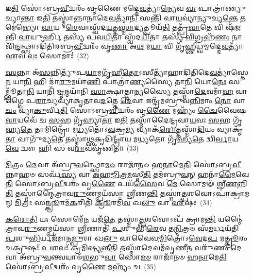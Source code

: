 𑌇\-\ul{𑌤𑌿} 𑌸𑍋॑\-𑌽𑌬𑍍𑌰\-\ul{𑌵𑍀}\-𑌦𑍍𑌵𑌰𑌂᳴ 𑌵𑍃𑌣𑍈 𑌮𑌦𑍍𑌦𑍇\-\ul{𑌵}\-𑌤𑍍𑌯𑌾॑\-\ul{𑌨𑍍𑌯𑍇}\-𑌵 \ul{𑌵𑌃} 𑌪𑌾𑌤𑍍𑌰𑌾॑𑌣𑍍𑌯𑍁𑌚𑍍𑌯𑌾\-\ul{𑌨𑍍𑌤𑌾} 𑌇\-\ul{𑌤𑌿} 𑌤𑌸𑍍𑌮𑌾॑𑌨𑍍𑌨𑌾𑌨𑌾𑌦𑍇\-\ul{𑌵}\-𑌤𑍍𑌯𑌾᳴\-\ul{𑌨𑌿} 𑌸𑌨𑍍𑌤𑌿᳴ 𑌵𑌾\-\ul{𑌯}\-𑌵𑍍𑌯𑌾॑𑌨𑍍𑌯𑍁𑌚𑍍𑌯\-\ul{𑌨𑍍𑌤𑍇} 𑌤𑌮𑍇॑𑌭𑍍𑌯𑍋 \ul{𑌵𑌾}\-𑌯𑍁\-\ul{𑌰𑍇}\-𑌵𑌾𑌸𑍍𑌵᳴𑌦\-\ul{𑌯}\-𑌤𑍍𑌤\-\ul{𑌸𑍍𑌮𑌾}\-𑌦𑍍𑌯𑌤𑍍𑌪𑍂𑌯᳴\-\ul{𑌤𑌿} 𑌤𑌤𑍍𑌪𑍍𑌰᳴\-\ul{𑌵𑌾}\-𑌤𑍇 𑌵𑌿 𑌷᳴𑌜𑌨𑍍𑌤𑌿 \ul{𑌵𑌾}\-𑌯𑍁𑌰𑍍\mbox{}𑌹𑌿 𑌤𑌸𑍍𑌯᳴ 𑌪𑌵\-\ul{𑌯𑌿}\-𑌤𑌾 𑌸𑍍𑌵᳴𑌦\-\ul{𑌯𑌿}\-𑌤𑌾 𑌤𑌸𑍍𑌯᳴ \ul{𑌵𑌿}\-𑌗𑍍𑌰𑌹᳴\-\ul{𑌣𑌂} 𑌨𑌾𑌵𑌿᳴\-\ul{𑌨𑍍𑌦}\-𑌨𑍍𑌥𑍍𑌸𑌾\-𑌽𑌦𑌿᳴𑌤𑌿𑌰𑌬𑍍𑌰\-\ul{𑌵𑍀}\-𑌦𑍍𑌵𑌰𑌂᳴ 𑌵𑍃\-\ul{𑌣𑌾} 𑌅\-\ul{𑌥} 𑌮\-\ul{𑌯𑌾} 𑌵𑌿 𑌗𑍃᳴𑌹𑍍𑌣𑍀𑌧𑍍𑌵𑌮𑍍𑌮𑌦𑍍𑌦𑍇\-\ul{𑌵}\-𑌤𑍍𑌯𑌾᳴ \ul{𑌏}\-𑌵 \ul{𑌵𑌃} 𑌸𑍋𑌮𑌾𑌃॑~(32)

\-\ul{𑌸}\-𑌨𑍍𑌨𑌾 𑌅᳴\-\ul{𑌸}\-𑌨𑍍𑌨𑌿𑌤𑍍𑌯𑍁᳴𑌪\-\ul{𑌯𑌾}\-𑌮𑌗𑍃᳴𑌹𑍀\-\ul{𑌤𑍋}\-\-𑌽𑌸𑍀𑌤𑍍𑌯𑌾᳴𑌹𑌾𑌦𑌿𑌤𑌿𑌦𑍇\-\ul{𑌵}\-𑌤𑍍𑌯𑌾॑𑌸𑍍𑌤𑍇\-\ul{𑌨} 𑌯𑌾\-\ul{𑌨𑌿} 𑌹𑌿 𑌦𑌾᳴\-\ul{𑌰𑍁}\-𑌮𑌯𑌾᳴\-\ul{𑌣𑌿} 𑌪𑌾𑌤𑍍𑌰𑌾॑\-\ul{𑌣𑍍𑌯}\-𑌸𑍍𑌯𑍈 𑌤𑌾\-\ul{𑌨𑌿} 𑌯𑍋\-\ul{𑌨𑍇𑌃} 𑌸𑌮𑍍𑌭𑍂᳴𑌤𑌾\-\ul{𑌨𑌿} 𑌯𑌾𑌨𑌿᳴ \ul{𑌮𑍃}\-𑌨𑍍𑌮𑌯𑌾᳴𑌨𑌿 \ul{𑌸𑌾}\-𑌕𑍍𑌷𑌾𑌤𑍍𑌤𑌾\-\ul{𑌨𑍍𑌯}\-𑌸𑍍𑌯𑍈 𑌤𑌸𑍍𑌮𑌾᳴\-\ul{𑌦𑍇}\-𑌵𑌮𑌾᳴\-\ul{𑌹} 𑌵𑌾𑌗𑍍𑌵𑍈 𑌪\-\ul{𑌰𑌾}\-𑌚𑍍𑌯𑌵𑍍𑌯𑌾᳴𑌕𑍃𑌤𑌾𑌵\-\ul{𑌦}\-𑌤𑍍𑌤𑍇 \ul{𑌦𑍇}\-𑌵𑌾 𑌇𑌨𑍍𑌦𑍍𑌰᳴𑌮𑌬𑍍𑌰𑍁𑌵\-\ul{𑌨𑍍𑌨𑌿}\-𑌮𑌾𑌂 \ul{𑌨𑍋} 𑌵𑌾\-\ul{𑌚𑌂} 𑌵𑍍𑌯𑌾\-\ul{𑌕𑍁}\-𑌰𑍍𑌵𑌿\-\ul{𑌤𑌿} 𑌸𑍋॑\-𑌽𑌬𑍍𑌰\-\ul{𑌵𑍀}\-𑌦𑍍𑌵𑌰𑌂᳴ 𑌵𑍃\-\ul{𑌣𑍈} 𑌮𑌹𑍍𑌯𑌂᳴ \ul{𑌚𑍈}\-𑌵𑍈𑌷 \ul{𑌵𑌾}\-𑌯𑌵𑍇᳴ 𑌚 \ul{𑌸}\-𑌹 𑌗𑍃᳴𑌹𑍍𑌯𑌾\-\ul{𑌤𑌾} 𑌇\-\ul{𑌤𑌿} 𑌤𑌸𑍍𑌮𑌾᳴𑌦𑍈𑌨𑍍𑌦𑍍𑌰𑌵𑌾\-\ul{𑌯}\-𑌵𑌃 \ul{𑌸}\-𑌹 𑌗𑍃᳴𑌹𑍍𑌯\-\ul{𑌤𑍇} 𑌤𑌾𑌮𑌿𑌨𑍍𑌦𑍍𑌰𑍋᳴ 𑌮\-\ul{𑌧𑍍𑌯}\-𑌤𑍋᳴\-𑌽\-\ul{𑌵}\-𑌕𑍍𑌰\-\ul{𑌮𑍍𑌯} 𑌵𑍍𑌯𑌾𑌕᳴\-\ul{𑌰𑍋}\-𑌤𑍍𑌤𑌸𑍍𑌮𑌾᳴\-\ul{𑌦𑌿}\-𑌯𑌂 𑌵𑍍𑌯𑌾𑌕𑍃᳴\-\ul{𑌤𑌾} 𑌵𑌾𑌗𑍁᳴𑌦𑍍𑌯\-\ul{𑌤𑍇} 𑌤𑌸𑍍𑌮𑌾॑\-\ul{𑌥𑍍𑌸}\-𑌕𑍃𑌦𑌿𑌨𑍍𑌦𑍍𑌰𑌾᳴𑌯 𑌮\-\ul{𑌧𑍍𑌯}\-𑌤𑍋 𑌗𑍃᳴𑌹𑍍𑌯\-\ul{𑌤𑍇} 𑌦𑍍𑌵𑌿\-\ul{𑌰𑍍𑌵𑌾}\-𑌯\-\ul{𑌵𑍇} 𑌦𑍍𑌵𑍗 𑌹𑌿 𑌸 𑌵\-\ul{𑌰𑌾}\-𑌵𑌵𑍃᳴𑌣𑍀𑌤॥~(33)

{\anuvakamend[{\-\ul{𑌸𑍍𑌵}\-\-\ul{𑌦}\-\-\ul{𑌯} 𑌸𑍋𑌮𑌾𑌃॑ \ul{𑌸}\-𑌹𑌾𑌷𑍍𑌟𑌾𑌵𑌿𑍞᳴𑌶𑌤𑌿𑌶𑍍𑌚}]}%

\-\ul{𑌮𑌿}\-𑌤𑍍𑌰𑌂 \ul{𑌦𑍇}\-𑌵𑌾 𑌅᳴𑌬𑍍𑌰𑍁\-\ul{𑌵}\-𑌨𑍍𑌥𑍍𑌸𑍋\-\ul{𑌮}\-\-\ul{𑍞} 𑌰𑌾𑌜𑌾᳴𑌨𑍞 𑌹\-\ul{𑌨𑌾}\-𑌮𑍇\-\ul{𑌤𑌿} 𑌸𑍋॑\-𑌽𑌬𑍍𑌰\-\ul{𑌵𑍀}\-𑌨𑍍𑌨𑌾𑌹𑍞 𑌸𑌰𑍍𑌵᳴\-\ul{𑌸𑍍𑌯} 𑌵𑌾 \ul{𑌅}\-𑌹\-\ul{𑌮𑍍𑌮𑌿}\-𑌤𑍍𑌰\-\ul{𑌮}\-𑌸𑍍𑌮𑍀\-\ul{𑌤𑌿} 𑌤𑌮᳴𑌬𑍍𑌰𑍁\-\ul{𑌵}\-𑌨𑍍 𑌹𑌨𑌾᳴\-\ul{𑌮𑍈}\-𑌵𑍇\-\ul{𑌤𑌿} 𑌸𑍋॑\-𑌽𑌬𑍍𑌰\-\ul{𑌵𑍀}\-𑌦𑍍𑌵𑌰𑌂᳴ 𑌵𑍃\-\ul{𑌣𑍈} 𑌪𑌯᳴\-\ul{𑌸𑍈}\-𑌵 \ul{𑌮𑍇} 𑌸𑍋𑌮𑍟᳴ 𑌶𑍍𑌰𑍀\-\ul{𑌣}\-𑌨𑍍𑌨𑌿\-\ul{𑌤𑌿} 𑌤𑌸𑍍𑌮𑌾॑𑌨𑍍𑌮𑍈𑌤𑍍𑌰𑌾𑌵\-\ul{𑌰𑍁}\-𑌣𑌮𑍍𑌪𑌯᳴𑌸𑌾 𑌶𑍍𑌰𑍀𑌣\-\ul{𑌨𑍍𑌤𑌿} 𑌤𑌸𑍍𑌮𑌾॑\-\ul{𑌤𑍍𑌪}\-𑌶𑌵𑍋\-𑌽𑌪𑌾॑𑌕𑍍𑌰𑌾𑌮𑌨𑍍 \ul{𑌮𑌿}\-𑌤𑍍𑌰𑌃 𑌸\-\ul{𑌨𑍍𑌕𑍍𑌰𑍂}\-𑌰𑌮᳴\-\ul{𑌕}\-𑌰𑌿𑌤𑌿᳴ \ul{𑌕𑍍𑌰𑍂}\-𑌰𑌮𑌿᳴\-\ul{𑌵} 𑌖\-\ul{𑌲𑍁} 𑌵𑌾 \ul{𑌏}\-𑌷𑌃~(34)

\-\ul{𑌕}\-\-\ul{𑌰𑍋}\-\-\ul{𑌤𑌿} 𑌯𑌃 𑌸𑍋𑌮𑍇᳴\-\ul{𑌨} 𑌯𑌜᳴\-\ul{𑌤𑍇} 𑌤𑌸𑍍𑌮𑌾॑\-\ul{𑌤𑍍𑌪}\-𑌶𑌵𑍋\-𑌽𑌪᳴ 𑌕𑍍𑌰𑌾𑌮\-\ul{𑌨𑍍𑌤𑌿} 𑌯𑌨𑍍𑌮𑍈॑𑌤𑍍𑌰𑌾𑌵\-\ul{𑌰𑍁}\-𑌣𑌮𑍍𑌪𑌯᳴𑌸𑌾 \ul{𑌶𑍍𑌰𑍀}\-𑌣𑌾𑌤𑌿᳴ \ul{𑌪}\-𑌶𑍁𑌭𑌿᳴\-\ul{𑌰𑍇}\-𑌵 𑌤\-\ul{𑌨𑍍𑌮𑌿}\-𑌤𑍍𑌰𑍞 𑌸᳴\-\ul{𑌮}\-𑌰𑍍𑌧𑌯᳴𑌤𑌿 \ul{𑌪}\-𑌶𑍁\-\ul{𑌭𑌿}\-𑌰𑍍𑌯𑌜᳴𑌮𑌾𑌨\-\ul{𑌮𑍍𑌪𑍁}\-𑌰𑌾 𑌖\-\ul{𑌲𑍁} 𑌵𑌾𑌵𑍈𑌵\-\ul{𑌮𑍍𑌮𑌿}\-𑌤𑍍𑌰𑍋᳴\-𑌽\-\ul{𑌵𑍇}\-𑌦\-\ul{𑌪} 𑌮\-\ul{𑌤𑍍𑌕𑍍𑌰𑍂}\-𑌰𑌂 \ul{𑌚}\-𑌕𑍍𑌰𑍁𑌷𑌃᳴ \ul{𑌪}\-𑌶𑌵𑌃᳴ 𑌕𑍍𑌰𑌮𑌿\-\ul{𑌷𑍍𑌯}\-𑌨𑍍𑌤𑍀\-\ul{𑌤𑌿} 𑌤𑌸𑍍𑌮𑌾᳴\-\ul{𑌦𑍇}\-𑌵𑌮᳴𑌵𑍃𑌣𑍀\-\ul{𑌤} 𑌵𑌰𑍁᳴𑌣𑌂 \ul{𑌦𑍇}\-𑌵𑌾 𑌅᳴𑌬𑍍𑌰𑍁\-\ul{𑌵}\-𑌨𑍍𑌤𑍍𑌵𑌯𑌾𑍞᳴\-\ul{𑌶}\-𑌭𑍁\-\ul{𑌵𑌾} 𑌸𑍋\-\ul{𑌮}\-\-\ul{𑍞} 𑌰𑌾𑌜𑌾᳴𑌨𑍞 𑌹\-\ul{𑌨𑌾}\-𑌮𑍇\-\ul{𑌤𑌿} 𑌸𑍋॑\-𑌽𑌬𑍍𑌰\-\ul{𑌵𑍀}\-𑌦𑍍𑌵𑌰𑌂᳴ 𑌵𑍃\-\ul{𑌣𑍈} 𑌮𑌹𑍍𑌯𑌂᳴ 𑌚~(35)

